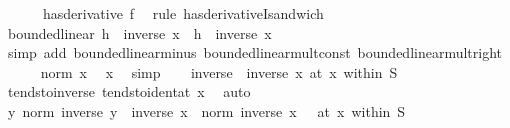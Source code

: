 \begin{isabellebody}
\ \ \ \ {\isacharparenleft}{\kern0pt}\ {\isachardoublequoteopen}{\isacharparenleft}{\kern0pt}{\isacharunderscore}{\kern0pt}\ has{\isacharunderscore}{\kern0pt}derivative\ {\isacharquery}{\kern0pt}f{\isacharparenright}{\kern0pt}\ {\isacharunderscore}{\kern0pt}{\isachardoublequoteclose}{\isacharparenright}{\kern0pt}\isanewline
%
\isadelimproof
%
\endisadelimproof
%
\isatagproof
{}\isamarkupfalse%
\ {\isacharparenleft}{\kern0pt}rule\ has{\isacharunderscore}{\kern0pt}derivativeI{\isacharunderscore}{\kern0pt}sandwich{\isacharparenright}{\kern0pt}\isanewline
\ \ \isamarkupfalse%
\ {\isachardoublequoteopen}bounded{\isacharunderscore}{\kern0pt}linear\ {\isacharparenleft}{\kern0pt}{\isasymlambda}h{\isachardot}{\kern0pt}\ {\isacharminus}{\kern0pt}\ {\isacharparenleft}{\kern0pt}inverse\ x\ {\isacharasterisk}{\kern0pt}\ h\ {\isacharasterisk}{\kern0pt}\ inverse\ x{\isacharparenright}{\kern0pt}{\isacharparenright}{\kern0pt}{\isachardoublequoteclose}\isanewline
\ \ \ \ \isamarkupfalse%
\ {\isacharparenleft}{\kern0pt}simp\ add{\isacharcolon}{\kern0pt}\ bounded{\isacharunderscore}{\kern0pt}linear{\isacharunderscore}{\kern0pt}minus\ bounded{\isacharunderscore}{\kern0pt}linear{\isacharunderscore}{\kern0pt}mult{\isacharunderscore}{\kern0pt}const\ bounded{\isacharunderscore}{\kern0pt}linear{\isacharunderscore}{\kern0pt}mult{\isacharunderscore}{\kern0pt}right{\isacharparenright}{\kern0pt}\isanewline
\ \ \isamarkupfalse%
\ {\isachardoublequoteopen}{}\ {\isacharless}{\kern0pt}\ norm\ x{\isachardoublequoteclose}\ \isamarkupfalse%
\ x\ \isamarkupfalse%
\ simp\isanewline
\ \ \isamarkupfalse%
\ {\isachardoublequoteopen}{\isacharparenleft}{\kern0pt}inverse\ {\isasymlonglongrightarrow}\ inverse\ x{\isacharparenright}{\kern0pt}\ {\isacharparenleft}{\kern0pt}at\ x\ within\ S{\isacharparenright}{\kern0pt}{\isachardoublequoteclose}\isanewline
\ \ \ \ \isamarkupfalse%
\ tendsto{\isacharunderscore}{\kern0pt}inverse\ tendsto{\isacharunderscore}{\kern0pt}ident{\isacharunderscore}{\kern0pt}at\ x\ \isamarkupfalse%
\ auto\isanewline
\ \ \isamarkupfalse%
\ \isamarkupfalse%
\ {\isachardoublequoteopen}{\isacharparenleft}{\kern0pt}{\isacharparenleft}{\kern0pt}{\isasymlambda}y{\isachardot}{\kern0pt}\ norm\ {\isacharparenleft}{\kern0pt}inverse\ y\ {\isacharminus}{\kern0pt}\ inverse\ x{\isacharparenright}{\kern0pt}\ {\isacharasterisk}{\kern0pt}\ norm\ {\isacharparenleft}{\kern0pt}inverse\ x{\isacharparenright}{\kern0pt}{\isacharparenright}{\kern0pt}\ {\isasymlonglongrightarrow}\ {}{\isacharparenright}{\kern0pt}\ {\isacharparenleft}{\kern0pt}at\ x\ within\ S{\isacharparenright}{\kern0pt}{\isachardoublequoteclose}\isanewline

\end{isabellebody}

